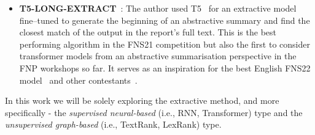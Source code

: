 \begin{itemize}
    \item \textbf{T5-LONG-EXTRACT}~\cite{orzhenovskii-2021-t5}: The author used T5~\cite{rayson2019t5} for an extractive model fine--tuned to generate the beginning of an abstractive summary and find the closest match of the output in the report’s full text.
    This is the best performing algorithm in the FNS21 competition but also the first to consider transformer models from an abstractive summarisation perspective in the FNP workshops so far.
    It serves as an inspiration for the best English FNS22 model~\cite{el-haj-etal-2022-financial} and other contestants~\cite{khanna-etal-2022-transformer, foroutan-etal-2022-multilingual}.

\end{itemize}

In this work we will be solely exploring the extractive method, and more specifically - the \emph{supervised neural-based} (i.e., RNN, Transformer) type and the \emph{unsupervised graph-based} (i.e., TextRank, LexRank) type.

